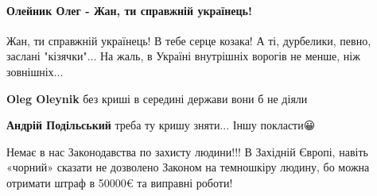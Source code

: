  
 
 
 
 
\paragraph{Олейник Олег - Жан, ти справжній українець!}

\begin{itemize}
 
Жан, ти справжній українець! В тебе серце козака! А ті, дурбелики, певно, заслані "кізячки"...
На жаль, в Україні внутрішніх ворогів не менше, ніж зовнішніх...

\begin{itemize}
 
\textbf{Oleg Oleynik} без криші в середині держави вони б не діяли

 
\textbf{Андрій Подільський} треба ту кришу зняти... Іншу покласти😀
\end{itemize}

 

Немає в нас Законодавства по захисту людини!!! В Західній Європі, навіть
«чорний» сказати не дозволено Законом на темношкіру людину, бо можна отримати
штраф в 50000€ та виправні роботи!


\end{itemize}
